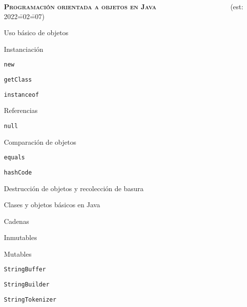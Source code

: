 \begin{longenum}
\begin{longenum}
\begin{longenum}
        \end{longenum}
    \end{longenum}
    \item \textbf{\textsc{Programación orientada a objetos en Java}} \ \ \ \ \ \ \ \ \ \ \ \ \ \ \ \ \ \ \ \ \ (est: 2022\==02\==07)
    \begin{longenum}
        \item Uso básico de objetos
        \begin{longenum}
            \item Instanciación
            \begin{longenum}
                \item \texttt{new}
                \item \texttt{getClass}
                \item \texttt{instanceof}
            \end{longenum}
            \item Referencias
            \begin{longenum}
                \item \texttt{null}
            \end{longenum}
            \item Comparación de objetos
            \begin{longenum}
                \item \texttt{equals}
                \item \texttt{hashCode}
            \end{longenum}
            \item Destrucción de objetos y recolección de basura
        \end{longenum}
        \item Clases y objetos básicos en Java
        \begin{longenum}
            \item Cadenas
            \begin{longenum}
                \item Inmutables
                \item Mutables
                \begin{longenum}
                    \item \texttt{StringBuffer}
                    \item \texttt{StringBuilder}
                    \item \texttt{StringTokenizer}

\end{longenum}
\end{longenum}
\end{longenum}
\end{longenum}
\end{longenum}
